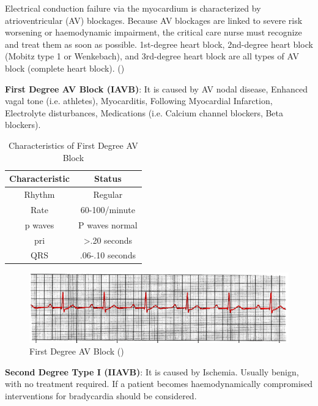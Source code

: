 Electrical conduction failure via the myocardium is characterized by atrioventricular (AV) blockages. Because AV blockages are linked to severe risk worsening or haemodynamic impairment, the critical care nurse must recognize and treat them as soon as possible. 1st-degree heart block, 2nd-degree heart block (Mobitz type 1 or Wenkebach), and 3rd-degree heart block are all types of AV block (complete heart block).  (\cite{arryth_types})

\textbf{First Degree AV Block (IAVB)}: It is caused by AV nodal disease, Enhanced vagal tone (i.e. athletes), Myocarditis, Following Myocardial Infarction, Electrolyte disturbances, Medications (i.e. Calcium channel blockers, Beta blockers).

\begin{table}[H]
\begin{center}
\begin{tabular}{||c || c||}
 \hline
\textbf{Characteristic} & \textbf{Status} \\ [0.4ex] 
 \hline\hline
 Rhythm & Regular \\
\hline
Rate & 60-100/minute \\
\hline
p waves & P waves normal  \\
\hline
pri & >.20 seconds     \\
\hline
QRS & .06-.10 seconds \\
\hline\hline
\end{tabular}
\end{center}
\caption{Characteristics of First Degree AV Block}
\label{table:IAVB_characteristics}
\end{table}

 \begin{figure}[H]
\centering
\includegraphics[scale=0.8]{img/IAVB.png}
\caption{First Degree AV Block (\cite{arryth_types})}
\label{fig:IAVB}
\end{figure}


\textbf{Second Degree Type I (IIAVB)}: It is caused by Ischemia. Usually benign, with no treatment required. If a patient becomes haemodynamically compromised interventions for bradycardia should be considered.


